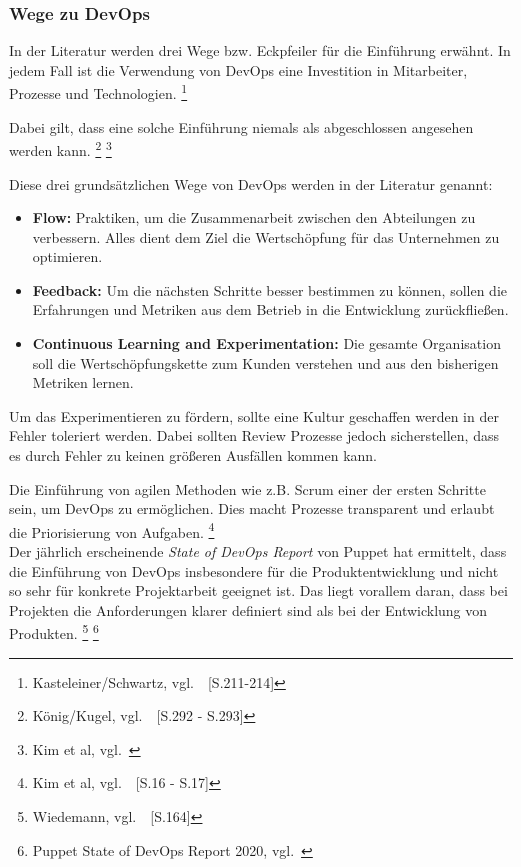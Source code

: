 \newpage
\subsubsection{Wege zu DevOps}\label{devops_wege}

In der Literatur werden drei Wege bzw. Eckpfeiler für die Einführung erwähnt.
In jedem Fall ist die Verwendung von DevOps eine Investition in Mitarbeiter, Prozesse und Technologien.
\footnote{Kasteleiner/Schwartz, vgl.~\cite{Kasteleiner2019}~[S.211-214]}

Dabei gilt, dass eine solche Einführung niemals als abgeschlossen angesehen werden kann.
\footnote{König/Kugel, vgl.~\cite{Konig2019}~[S.292 - S.293]}
\footnote{Kim et al, vgl.~\cite{Kim2018}}

Diese drei grundsätzlichen Wege von DevOps werden in der Literatur genannt:

\begin{itemize}
    \item \textbf{Flow:}
    Praktiken, um die Zusammenarbeit zwischen den Abteilungen zu verbessern.
    Alles dient dem Ziel die Wertschöpfung für das Unternehmen zu optimieren.

    \item \textbf{Feedback:}
    Um die nächsten Schritte besser bestimmen zu können, sollen die Erfahrungen und Metriken aus dem Betrieb in die Entwicklung zurückfließen.

    \item \textbf{Continuous Learning and Experimentation:}
    Die gesamte Organisation soll die Wertschöpfungskette zum Kunden verstehen und aus den bisherigen Metriken lernen.
\end{itemize}

Um das Experimentieren zu fördern, sollte eine Kultur geschaffen werden in der Fehler toleriert werden.
Dabei sollten Review Prozesse jedoch sicherstellen, dass es durch Fehler zu keinen größeren Ausfällen kommen kann.

Die Einführung von agilen Methoden wie z.B. Scrum einer der ersten Schritte sein, um DevOps zu ermöglichen.
Dies macht Prozesse transparent und erlaubt die Priorisierung von Aufgaben.
\footnote{Kim et al, vgl.~\cite{Kim2018}~[S.16 - S.17]} \\

Der jährlich erscheinende \textsl{State of DevOps Report} von Puppet hat ermittelt, dass die Einführung von DevOps insbesondere für die Produktentwicklung und nicht so sehr für konkrete Projektarbeit geeignet ist.
Das liegt vorallem daran, dass bei Projekten die Anforderungen klarer definiert sind als bei der Entwicklung von Produkten.
\footnote{Wiedemann, vgl.~\cite{Wiedemann2019}~[S.164]}
\footnote{Puppet State of DevOps Report 2020, vgl.~\cite{PUPPET}}

